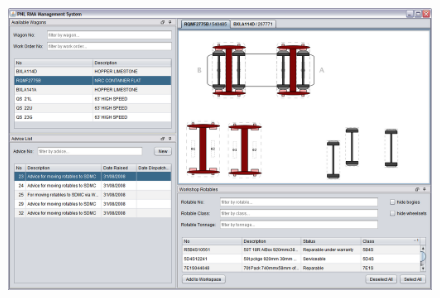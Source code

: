 \documentclass[a4paper,12pt,twocolumn]{article}
\begin{document}
  \begin{figure}[!h]
  \centering
  \includegraphics[scale=0.18]{images/02-workspace-custom-layout.png}
  \end{figure}
\end{document}
